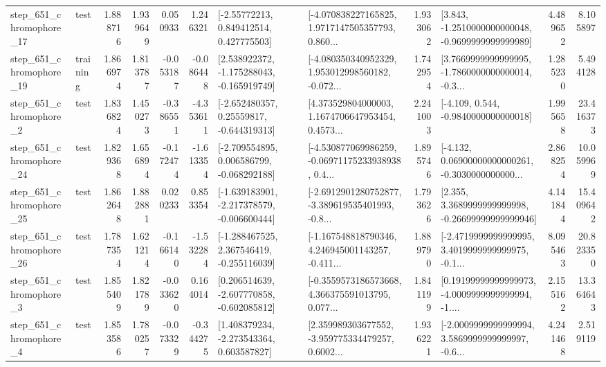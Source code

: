 \begin{tabular}{llrrrrllrlrr}
  step\_651\_chromophore\_17 &      test &      1.888716 &    1.939649 &      0.050933 &  1.246321 &     [-2.55772213, 0.849412514, 0.427775503] &  [-4.070838227165825, 1.9717147505357793, 0.860... &       1.933062 &  [3.843, -1.2510000000000048, -0.9699999999999989] &            4.489652 &          8.105897 \\
  step\_651\_chromophore\_19 &  training &      1.866974 &    1.813787 &     -0.053187 & -0.086448 &   [2.538922372, -1.175288043, -0.165919749] &  [-4.080350340952329, 1.953012998560182, -0.072... &       1.742954 &  [3.7669999999999995, -1.7860000000000014, -0.3... &            1.285230 &          5.494128 \\
   step\_651\_chromophore\_2 &      test &      1.836824 &    1.450273 &     -0.386551 & -4.353611 &    [-2.652480357, 0.25559817, -0.644319313] &  [4.373529804000003, 1.1674706647953454, 0.4573... &       2.241003 &               [-4.109, 0.544, -0.9840000000000018] &            1.995658 &         23.416373 \\
  step\_651\_chromophore\_24 &      test &      1.829368 &    1.656894 &     -0.172474 & -1.613354 &   [-2.709554895, 0.006586799, -0.068292188] &  [-4.530877069986259, -0.06971175233938938, 0.4... &       1.895746 &  [-4.132, 0.06900000000000261, -0.3030000000000... &            2.868254 &         10.059969 \\
  step\_651\_chromophore\_25 &      test &      1.862648 &    1.882881 &      0.020233 &  0.853354 &  [-1.639183901, -2.217378579, -0.006600444] &  [-2.6912901280752877, -3.389619535401993, -0.8... &       1.793626 &  [2.355, 3.3689999999999998, -0.26699999999999946] &            4.141844 &         15.409642 \\
  step\_651\_chromophore\_26 &      test &      1.787354 &    1.621214 &     -0.166140 & -1.532284 &   [-1.288467525, 2.367546419, -0.255116039] &  [-1.167548818790346, 4.246945001143257, -0.411... &       1.889790 &  [-2.4719999999999995, 3.4019999999999975, -0.1... &            8.095463 &         20.823350 \\
   step\_651\_chromophore\_3 &      test &      1.855409 &    1.821789 &     -0.033620 &  0.164014 &   [0.206514639, -2.607770858, -0.602085812] &  [-0.3559573186573668, 4.366375591013795, 0.077... &       1.841199 &  [0.19199999999999973, -4.0009999999999994, -1.... &            2.155162 &         13.364643 \\
   step\_651\_chromophore\_4 &      test &      1.853586 &    1.780257 &     -0.073329 & -0.344275 &    [1.408379234, -2.273543364, 0.603587827] &  [2.359989303677552, -3.959775334479257, 0.6002... &       1.936221 &  [-2.0009999999999994, 3.5869999999999997, -0.6... &            4.241468 &          2.519119 \\

\end{tabular}

